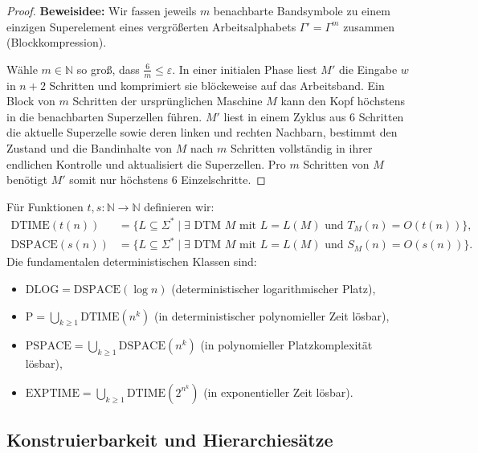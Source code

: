 \begin{proof}
    \textbf{Beweisidee:} Wir fassen jeweils $m$ benachbarte Bandsymbole zu einem einzigen Superelement eines vergrößerten Arbeitsalphabets $\Gamma' = \Gamma^m$ zusammen (Blockkompression).
    
    Wähle $m \in \mathbb{N}$ so groß, dass $\frac{6}{m} \le \varepsilon$. In einer initialen Phase liest $M'$ die Eingabe $w$ in $n+2$ Schritten und komprimiert sie blöckeweise auf das Arbeitsband. Ein Block von $m$ Schritten der ursprünglichen Maschine $M$ kann den Kopf höchstens in die benachbarten Superzellen führen. $M'$ liest in einem Zyklus aus 6 Schritten die aktuelle Superzelle sowie deren linken und rechten Nachbarn, bestimmt den Zustand und die Bandinhalte von $M$ nach $m$ Schritten vollständig in ihrer endlichen Kontrolle und aktualisiert die Superzellen. Pro $m$ Schritten von $M$ benötigt $M'$ somit nur höchstens 6 Einzelschritte.
\end{proof}

\begin{definition}
    Für Funktionen $t, s : \mathbb{N} \to \mathbb{N}$ definieren wir:
    \begin{align*}
        \mathrm{DTIME}(t(n)) &= \{L \subseteq \Sigma^* \mid \exists \text{ DTM } M \text{ mit } L = L(M) \text{ und } T_M(n) = O(t(n))\}, \\
        \mathrm{DSPACE}(s(n)) &= \{L \subseteq \Sigma^* \mid \exists \text{ DTM } M \text{ mit } L = L(M) \text{ und } S_M(n) = O(s(n))\}.
    \end{align*}
    Die fundamentalen deterministischen Klassen sind:
    \begin{itemize}
        \item $\mathrm{DLOG} = \mathrm{DSPACE}(\log n)$ (deterministischer logarithmischer Platz),
        \item $\mathrm{P} = \bigcup_{k \ge 1} \mathrm{DTIME}(n^k)$ (in deterministischer polynomieller Zeit lösbar),
        \item $\mathrm{PSPACE} = \bigcup_{k \ge 1} \mathrm{DSPACE}(n^k)$ (in polynomieller Platzkomplexität lösbar),
        \item $\mathrm{EXPTIME} = \bigcup_{k \ge 1} \mathrm{DTIME}(2^{n^k})$ (in exponentieller Zeit lösbar).
    \end{itemize}
\end{definition}

\subsection{Konstruierbarkeit und Hierarchiesätze}

